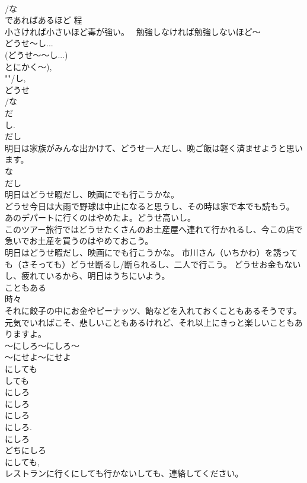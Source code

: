 \documentclass[8pt]{extreport}
\begin{document}
\begin{CJK}{UTF8}{min}
\\	/な
\\	であればあるほど 程　
\\	小さければ小さいほど毒が強い。　 勉強しなければ勉強しないほど～ 
\\	どうせ～し...	
\\	(どうせ～～し...) 
\\	とにかく～), 
\\	""/し, 
\\	どうせ
\\	/な
\\	だ
\\	し. 
\\	だし 
\\	明日は家族がみんな出かけて、どうせ一人だし、晩ご飯は軽く済ませようと思います。 
\\	な
\\	だし 
\\	明日はどうせ暇だし、映画にでも行こうかな。 
\\	どうせ今日は大雨で野球は中止になると思うし、その時は家で本でも読もう。 
\\	あのデパートに行くのはやめたよ。どうせ高いし。 
\\	このツアー旅行ではどうせたくさんのお土産屋へ連れて行かれるし、今この店で急いでお土産を買うのはやめておこう。 
\\	明日はどうせ暇だし、映画にでも行こうかな。 市川さん（いちかわ）を誘っても（さそっても）どうせ断るし/断られるし、二人で行こう。 どうせお金もないし、疲れているから、明日はうちにいよう。 
\\	こともある	
\\	時々 
\\	それに餃子の中にお金やピーナッツ、飴などを入れておくこともあるそうです。 
\\	元気でいればこそ、悲しいこともあるけれど、それ以上にきっと楽しいこともありますよ。 
\\	～にしろ～にしろ～	
\\	～にせよ～にせよ 
\\	にしても 
\\	しても 
\\	にしろ
\\	にしろ 
\\	にしろ
\\	にしろ. 
\\	にしろ 
\\	どちにしろ 
\\	にしても, 
\\	レストランに行くにしても行かないしても、連絡してください。 

\end{CJK}
\end{document}
